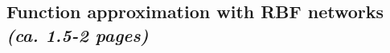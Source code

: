 \documentclass[a4paper]{article}
\begin{document}

\subsection{Function approximation with RBF networks\\ \normalsize{\textit{(ca. 1.5-2 pages)}}}
\end{document}
